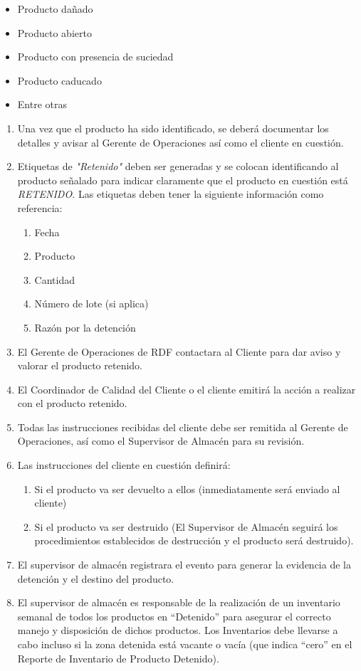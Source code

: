 \begin{itemize}
	\item Producto dañado
	\item Producto abierto
	\item Producto con presencia de suciedad
	\item Producto caducado
	\item Entre otras
\end{itemize}

\begin{enumerate}
	\item Una vez que el producto ha sido identificado, se deberá documentar los detalles y avisar al Gerente de Operaciones así como el cliente en cuestión.
	\item Etiquetas de \textit{"Retenido"} deben ser generadas y se colocan identificando al producto señalado para indicar claramente que el producto en cuestión está \textit{RETENIDO.} Las etiquetas deben tener la siguiente información como referencia:
	\begin{enumerate}
		\item Fecha
		\item Producto
		\item Cantidad
		\item Número de lote (si aplica)
		\item Razón por la detención
	\end{enumerate}
	\item El Gerente de Operaciones de RDF contactara al Cliente para dar aviso y valorar el producto retenido.
	\item El Coordinador de Calidad del Cliente o el cliente emitirá la acción a realizar con el producto retenido.
	\item Todas las instrucciones recibidas del cliente debe ser remitida al Gerente de Operaciones, así como el Supervisor de Almacén para su revisión.
	\item Las instrucciones del cliente en cuestión definirá:
	\begin{enumerate}
		\item Si el producto va ser devuelto a ellos (inmediatamente será enviado al cliente)
		\item Si el producto va ser destruido (El Supervisor de Almacén seguirá los procedimientos establecidos de destrucción y el producto será destruido).
	\end{enumerate}
	\item El supervisor de almacén registrara el evento para generar la evidencia de la detención y el destino del producto.
	\item El supervisor de almacén es responsable de la realización de un inventario semanal de todos los productos en “Detenido” para asegurar el correcto manejo y disposición de dichos productos. Los Inventarios debe llevarse a cabo incluso si la zona detenida está vacante o vacía (que indica “cero” en el Reporte de Inventario de Producto Detenido).
\end{enumerate}


